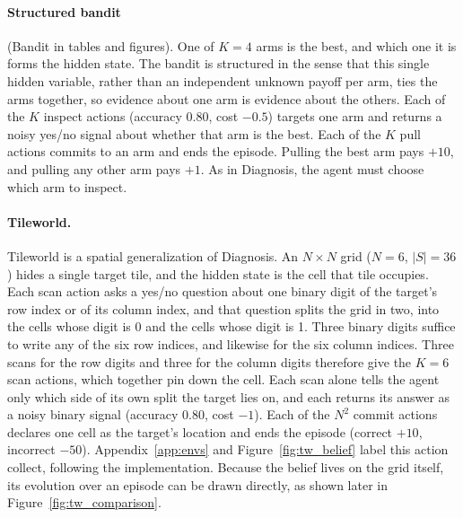 \paragraph{Structured bandit} (Bandit in tables and figures). One of $K{=}4$ arms is the best, and which one it is forms the hidden state. The bandit is structured in the sense that this single hidden variable, rather than an independent unknown payoff per arm, ties the arms together, so evidence about one arm is evidence about the others. Each of the $K$ inspect actions (accuracy 0.80, cost $-0.5$) targets one arm and returns a noisy yes/no signal about whether that arm is the best. Each of the $K$ pull actions commits to an arm and ends the episode. Pulling the best arm pays $+10$, and pulling any other arm pays $+1$. As in Diagnosis, the agent must choose which arm to inspect.

\paragraph{Tileworld.} Tileworld is a spatial generalization of Diagnosis. An $N{\times}N$ grid ($N{=}6$, $|S|{=}36$) hides a single target tile, and the hidden state is the cell that tile occupies. Each scan action asks a yes/no question about one binary digit of the target's row index or of its column index, and that question splits the grid in two, into the cells whose digit is 0 and the cells whose digit is 1. Three binary digits suffice to write any of the six row indices, and likewise for the six column indices. Three scans for the row digits and three for the column digits therefore give the $K{=}6$ scan actions, which together pin down the cell. Each scan alone tells the agent only which side of its own split the target lies on, and each returns its answer as a noisy binary signal (accuracy $0.80$, cost $-1$). Each of the $N^2$ commit actions declares one cell as the target's location and ends the episode (correct $+10$, incorrect $-50$). Appendix~\ref{app:envs} and Figure~\ref{fig:tw_belief} label this action collect, following the implementation. Because the belief lives on the grid itself, its evolution over an episode can be drawn directly, as shown later in Figure~\ref{fig:tw_comparison}.

